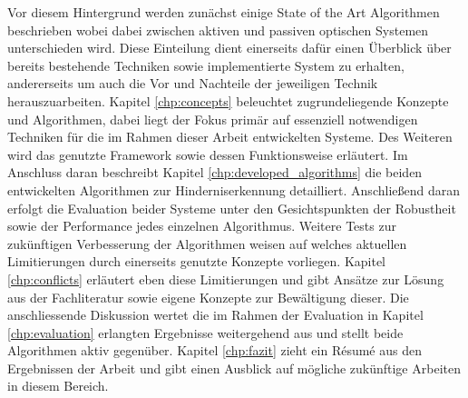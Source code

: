 \noindent
Vor diesem Hintergrund werden zunächst einige State of the Art Algorithmen beschrieben wobei dabei zwischen aktiven und passiven optischen Systemen unterschieden wird. Diese Einteilung dient einerseits dafür einen Überblick über bereits bestehende Techniken sowie implementierte System zu erhalten, andererseits um auch die Vor und Nachteile der jeweiligen Technik herauszuarbeiten. Kapitel \ref{chp:concepts} beleuchtet zugrundeliegende Konzepte und Algorithmen, dabei liegt der Fokus primär auf essenziell notwendigen Techniken für die im Rahmen dieser Arbeit entwickelten Systeme. Des Weiteren wird das genutzte Framework sowie dessen Funktionsweise erläutert. Im Anschluss daran beschreibt Kapitel \ref{chp:developed_algorithms} die beiden entwickelten Algorithmen zur Hinderniserkennung detailliert. Anschließend daran erfolgt die Evaluation beider Systeme unter den Gesichtspunkten der Robustheit sowie der Performance jedes einzelnen Algorithmus. Weitere Tests zur zukünftigen Verbesserung der Algorithmen weisen auf welches aktuellen Limitierungen durch einerseits genutzte Konzepte vorliegen. Kapitel \ref{chp:conflicts} erläutert eben diese Limitierungen und gibt Ansätze zur Lösung aus der Fachliteratur sowie eigene Konzepte zur Bewältigung dieser. Die anschliessende Diskussion wertet die im Rahmen der Evaluation in Kapitel \ref{chp:evaluation} erlangten Ergebnisse weitergehend aus und stellt beide Algorithmen aktiv gegenüber. Kapitel \ref{chp:fazit} zieht ein Ré­su­mé aus den Ergebnissen der Arbeit und gibt einen Ausblick auf mögliche zukünftige Arbeiten in diesem Bereich.